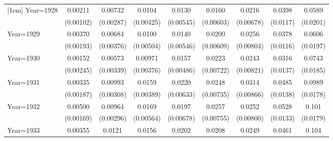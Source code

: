 \begin{table}[htbp]
\begin{tabular}{l*{8}{c}}
[1em]
Year=1928           &     0.00211\sym{**} &     0.00732\sym{**} &      0.0104\sym{**} &      0.0130\sym{**} &      0.0160\sym{***}&      0.0216\sym{***}&      0.0398\sym{***}&      0.0589\sym{***}\\
                    &   (0.00102)         &   (0.00287)         &   (0.00425)         &   (0.00545)         &   (0.00603)         &   (0.00678)         &    (0.0117)         &    (0.0201)         \\
[1em]
Year=1929           &     0.00370\sym{*}  &     0.00684\sym{*}  &      0.0100\sym{**} &      0.0140\sym{**} &      0.0200\sym{***}&      0.0256\sym{***}&      0.0378\sym{***}&      0.0606\sym{***}\\
                    &   (0.00193)         &   (0.00376)         &   (0.00504)         &   (0.00546)         &   (0.00609)         &   (0.00804)         &    (0.0116)         &    (0.0197)         \\
[1em]
Year=1930           &     0.00152         &     0.00573\sym{*}  &     0.00971\sym{**} &      0.0157\sym{***}&      0.0223\sym{***}&      0.0243\sym{***}&      0.0316\sym{**} &      0.0743\sym{***}\\
                    &   (0.00245)         &   (0.00339)         &   (0.00376)         &   (0.00486)         &   (0.00722)         &   (0.00821)         &    (0.0137)         &    (0.0185)         \\
[1em]
Year=1931           &     0.00335\sym{*}  &     0.00993\sym{***}&      0.0159\sym{***}&      0.0220\sym{***}&      0.0248\sym{***}&      0.0314\sym{***}&      0.0485\sym{***}&      0.0989\sym{***}\\
                    &   (0.00187)         &   (0.00308)         &   (0.00389)         &   (0.00633)         &   (0.00735)         &   (0.00866)         &    (0.0138)         &    (0.0178)         \\
[1em]
Year=1932           &     0.00500\sym{***}&     0.00964\sym{***}&      0.0169\sym{***}&      0.0197\sym{***}&      0.0257\sym{***}&      0.0252\sym{***}&      0.0528\sym{***}&       0.101\sym{***}\\
                    &   (0.00169)         &   (0.00296)         &   (0.00564)         &   (0.00678)         &   (0.00755)         &   (0.00800)         &    (0.0133)         &    (0.0179)         \\
[1em]
Year=1933           &     0.00355\sym{**} &      0.0121\sym{***}&      0.0156\sym{***}&      0.0202\sym{***}&      0.0208\sym{***}&      0.0249\sym{***}&      0.0461\sym{***}&       0.104\sym{***}\\

\end{tabular}
\end{table}
